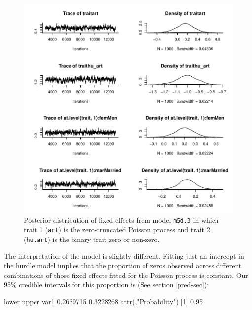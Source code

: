 \documentclass{article}
\begin{document}
\begin{figure}[!h]
\begin{center}
\includegraphics{Lecture5-046}
\end{center}
\caption{Posterior distribution of fixed effects from model \texttt{m5d.3} in which trait 1 (\texttt{art}) is the zero-truncated Poisson process and trait 2 (\texttt{hu.art}) is the binary trait zero or non-zero.}
\label{HU}
\end{figure}

The interpretation of the model is slightly different. Fitting just an intercept in the hurdle model implies that the proportion of zeros observed across different combinations of those fixed effects fitted for the Poisson process is constant. Our 95\% credible intervals for this proportion is (See section \ref{pred-sec}):

\begin{Schunk}
\begin{Soutput}
         lower     upper
var1 0.2639715 0.3228268
attr(,"Probability")
[1] 0.95
\end{Soutput}
\end{Schunk}
\end{document}
